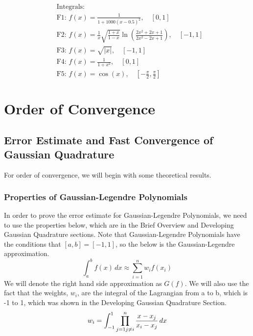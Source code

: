 \documentclass[12pt]{article}
\begin{document}
\begin{align*}
	 & \text{Integrals:}                                                                                                         \\
	 & \text{F1: }f(x) = \frac{1}{1 + 1000(x - 0.5)^2}, \quad [0, 1]                                                             \\
	 & \text{F2: }f(x) = \frac{1}{x}\sqrt{\frac{1 + x}{1 - x}}\ln\left(\frac{2x^2 + 2x + 1}{2x^2 - 2x + 1}\right), \quad [-1, 1] \\
	 & \text{F3: }f(x) = \sqrt{|x|}, \quad [-1, 1]                                                                               \\
	 & \text{F4: }f(x) = \frac{1}{1 + x^2}, \quad [0, 1]                                                                         \\
	 & \text{F5: }f(x) = \cos(x), \quad [-\frac{\pi}{2}, \frac{\pi}{2}]
\end{align*}

\section{Order of Convergence}

\subsection*{Error Estimate and Fast Convergence of Gaussian Quadrature}
For order of convergence, we will begin with some theoretical results.
\\
\subsubsection*{Properties of Gaussian-Legendre Polynomials}

In order to prove the error estimate for Gaussian-Legendre Polynomials, we need to use the properties below, which are in the Brief Overview and Developing Gaussian Quadrature sections. Note that Gaussian-Legendre Polynomials have the conditions that $[a, b] = [-1, 1]$, so the below is the Gaussian-Legendre approximation.
\begin{equation}
    \int_a^b f(x) \, dx \approx \sum_{i=1}^n w_i f(x_i)
\end{equation}
We will denote the right hand side approximation as $G(f)$. 
We will also use the fact that the weights, $w_i$, are the integral of the Lagrangian from a to b, which is -1 to 1, which was shown in the Developing Gaussian Quadrature Section.
\begin{equation}
    w_{i}=\int_{-1}^{1}\prod_{{j=1 \\j \ne i}}^{n} \frac{x-x_{j}}{x_{i}-x_{j}}\,dx
\end{equation}
\end{document}
